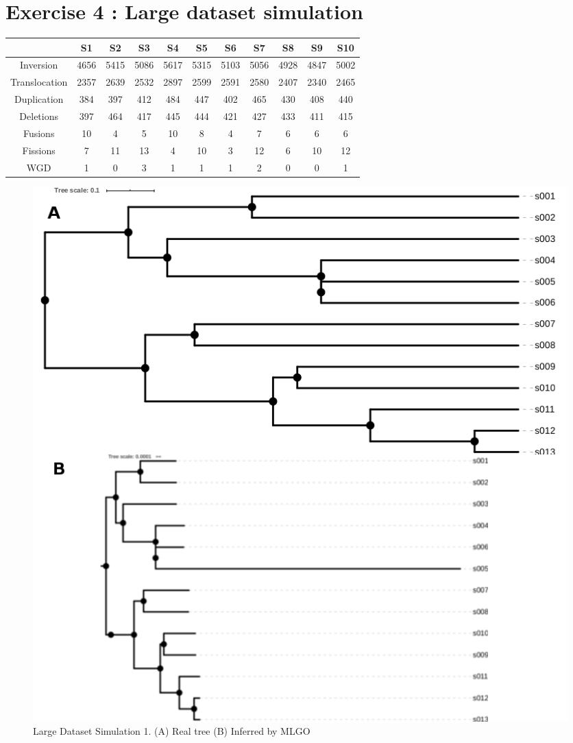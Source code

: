 \documentclass[]{article}
\theoremstyle{definition}
\begin{document}
\section{Exercise 4 : Large dataset simulation}
\begin{center}
	\begin{tabular}{|*{11}{c|}}
		\hline
		& S1& S2  & S3  & S4 & S5
		& S6& S7 & S8 & S9 & S10 \\
		\hline
		Inversion     &4656&5415&5086&5617&5315&5103&5056&4928&4847&5002 \\
		\hline
		Translocation &2357&2639&2532&2897&2599&2591&2580&2407&2340&2465 \\
		\hline
		Duplication   &384 &397 &412 &484 &447 &402 &465 &430 &408 &440  \\
		\hline
		Deletions     &397 &464 &417 &445 &444 &421 &427 &433 &411 &415  \\
		\hline
		Fusions       &10  &4   &5   &10  &8   &4   &7   &6   &6   &6    \\
		\hline
		Fissions      &7   &11  &13  &4   &10  &3   &12  &6   &10  &12   \\
		\hline
		WGD           &1   &0   &3   &1   &1   &1   &2   &0   &0   &1    \\
		\hline
	\end{tabular}
\end{center}

\begin{figure}[H]
	\includegraphics*[width = \linewidth]{image/new/large_1.png}
	\caption{ Large Dataset Simulation 1. (A) Real tree (B) Inferred by MLGO}
\end{figure}
\end{document}
